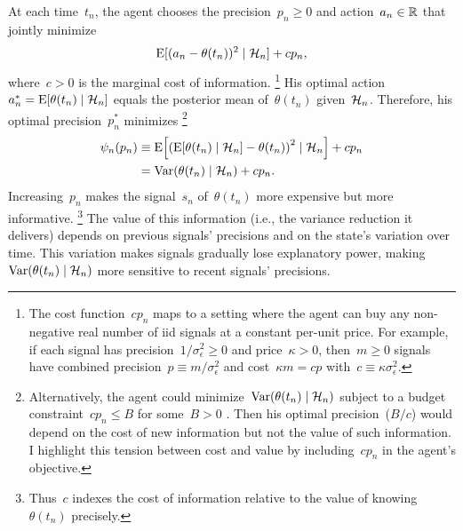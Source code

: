 \documentclass[11pt,oneside]{article}
\begin{document}
At each time~$t_n$, the agent chooses the precision~$p_n\ge0$ and action~$a_n\in\mathbb{R}$ that jointly minimize
\[ \operatorname{E}[(a_n-\theta(t_n))^2\mid\mathcal{H}_n]+cp_n, \]
where~$c>0$ is the marginal cost of information.%
\footnote{
The cost function~$cp_n$ maps to a setting where the agent can buy any non-negative real number of iid signals at a constant per-unit price.
For example, if each signal has precision~$1/\sigma_\epsilon^2\ge0$ and price~$\kappa>0$, then~$m\ge0$ signals have combined precision~$p\equiv m/\sigma_\epsilon^2$ and cost~$\kappa m=cp$ with~$c\equiv\kappa\sigma_\epsilon^2$.
}
His optimal action~$a_n^*=\operatorname{E}[\theta(t_n)\mid\mathcal{H}_n]$ equals the posterior mean of~$\theta(t_n)$ given~$\mathcal{H}_n$.
Therefore, his optimal precision~$p_n^*$ minimizes%
\footnote{
Alternatively, the agent could minimize~$\operatorname{Var}(\theta(t_n)\mid\mathcal{H}_n)$ subject to a budget constraint~$cp_n\le B$ for some~$B>0$ \citep[as in, e.g.,][]{Immorlica-etal-2021-LeibnizInt.Proc.Inform.LIPIcs}.
Then his optimal precision~($B/c$) would depend on the cost of new information but not the value of such information.
I highlight this tension between cost and value by including~$cp_n$ in the agent's objective.
}
%
\begin{align*}
    \psi_n(p_n)
    &\equiv \E\left[\left(\E[\theta(t_n)\mid\Hcal_n]-\theta(t_n)\right)^2\mid\Hcal_n\right]+cp_n \\
    &= \Var(\theta(t_n)\mid\Hcal_n)+cp_n.
\end{align*}
%
Increasing~$p_n$ makes the signal~$s_n$ of~$\theta(t_n)$ more expensive but more informative.%
\footnote{
Thus~$c$ indexes the cost of information relative to the value of knowing~$\theta(t_n)$ precisely.
}
The value of this information (i.e., the variance reduction it delivers) depends on previous signals' precisions and on the state's variation over time.
This variation makes signals gradually lose explanatory power, making~$\operatorname{Var}(\theta(t_n)\mid\mathcal{H}_n)$ more sensitive to recent signals' precisions.
\end{document}
